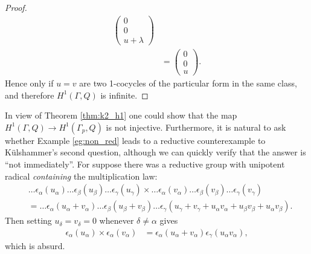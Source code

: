 \begin{proof}
\begin{align*}
		\left(\begin{matrix} 0 \\ 0 \\ u + \lambda\end{matrix}\right) \\
		&=
		\left(\begin{matrix} 0 \\ 0 \\ u\end{matrix}\right).
	\end{align*}
	Hence only if $u=v$ are two 1-cocycles of the particular form in the same class, and therefore $H^1(\Gamma, Q)$ is infinite.
\end{proof}

In view of Theorem \ref{thm:k2_h1} one could show that the map $H^1(\Gamma, Q) \rightarrow H^1(\Gamma_p, Q)$ is not injective. Furthermore, it is natural to ask whether Example \ref{eg:non_red} leads to a reductive counterexample to K\"ulshammer's second question, although we can quickly verify that the answer is ``not immediately''. For suppose there was a reductive group with unipotent radical \emph{containing} the multiplication law:
\begin{align*}
	&\ldots \epsilon_\alpha(u_\alpha) \ldots \epsilon_\beta(u_\beta) \ldots \epsilon_\gamma(u_\gamma) \times
	\ldots \epsilon_\alpha(v_\alpha) \ldots \epsilon_\beta(v_\beta) \ldots \epsilon_\gamma(v_\gamma)\\
	&=
	\ldots \epsilon_\alpha(u_\alpha + v_\alpha) \ldots \epsilon_\beta(u_\beta + v_\beta) \ldots \epsilon_\gamma(u_\gamma + v_\gamma + u_\alpha v_\alpha + u_\beta v_\beta + u_\alpha v_\beta).
\end{align*}
Then setting $u_\delta = v_\delta = 0$ whenever $\delta \neq \alpha$ gives
\begin{align*}
	\epsilon_\alpha(u_\alpha) \times \epsilon_\alpha(v_\alpha) &= \epsilon_\alpha(u_\alpha + v_\alpha) \epsilon_\gamma(u_\alpha v_\alpha),
\end{align*}
which is absurd.


